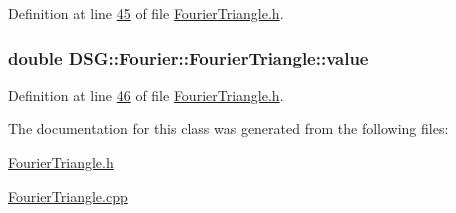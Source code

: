 Definition at line \hyperlink{_fourier_triangle_8h_source_l00045}{45} of file \hyperlink{_fourier_triangle_8h_source}{Fourier\+Triangle.\+h}.

\hypertarget{class_d_s_g_1_1_fourier_1_1_fourier_triangle_a11216186ce96fc78c7720cad3e01d025}{
\subsubsection[{value}]{\setlength{\rightskip}{0pt plus 5cm}double D\+S\+G\+::\+Fourier\+::\+Fourier\+Triangle\+::value\hspace{0.3cm}{\ttfamily [protected]}}}\label{class_d_s_g_1_1_fourier_1_1_fourier_triangle_a11216186ce96fc78c7720cad3e01d025}


Definition at line \hyperlink{_fourier_triangle_8h_source_l00046}{46} of file \hyperlink{_fourier_triangle_8h_source}{Fourier\+Triangle.\+h}.



The documentation for this class was generated from the following files\+:\begin{DoxyCompactItemize}
\item 
\hyperlink{_fourier_triangle_8h}{Fourier\+Triangle.\+h}\item 
\hyperlink{_fourier_triangle_8cpp}{Fourier\+Triangle.\+cpp}\end{DoxyCompactItemize}
